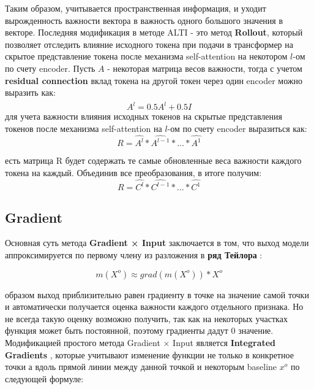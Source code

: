 \noindent\hspace{0.6cm}Таким образом, учитывается пространственная информация, и уходит вырожденность важности вектора в важность одного большого значения в векторе. Последняя модификация в методе ALTI - это метод \textbf{Rollout}, который позволяет отследить влияние исходного токена при подачи в трансформер на скрытое представление токена после механизма self-attention на некотором $l$-ом по счету encoder. Пусть $A$ - некоторая матрица весов важности, тогда с учетом \textbf{residual connection} вклад токена на другой токен через один encoder можно выразить как:
\begin{equation*}
    \widehat{A^l} = 0.5A^l + 0.5I
\end{equation*}
 для учета важности влияния исходных токенов на скрытые представления токенов после механизма self-attention на $l$-ом по счету encoder выразиться как:
\begin{equation*}
    R = \widehat{A^l}*\widehat{A^{l-1}}*...*\widehat{A^1}
\end{equation*}

 есть матрица R будет содержать те самые обновленные веса важности каждого токена на каждый. Объединив все преобразования, в итоге получим:
\begin{equation*}
    R = \widehat{C^l}*\widehat{C^{l-1}}*...*\widehat{C^1}
\end{equation*}

\subsection{Gradient}

\noindent\hspace{0.6cm}Основная суть метода \textbf{Gradient × Input} заключается в том, что выход модели аппроксимируется по первому члену из разложения в \textbf{ряд Тейлора} \cite{optimization3}:

\begin{equation*}
    m(X^o) \approx grad(m(X^o)) * X^o
\end{equation*}

 образом выход приблизительно равен градиенту в точке на значение самой точки и автоматически получается оценка важности каждого отдельного признака. Но не всегда такую оценку возможно получить, так как на некоторых участках функция может быть постоянной, поэтому градиенты дадут $0$ значение. Модификацией простого метода Gradient × Input является \textbf{Integrated Gradients} \cite{optimization3}, которые учитывают изменение функции не только в конкретное точки а вдоль прямой линии между данной точкой и некоторым baseline $x^o$ по следующей формуле:

